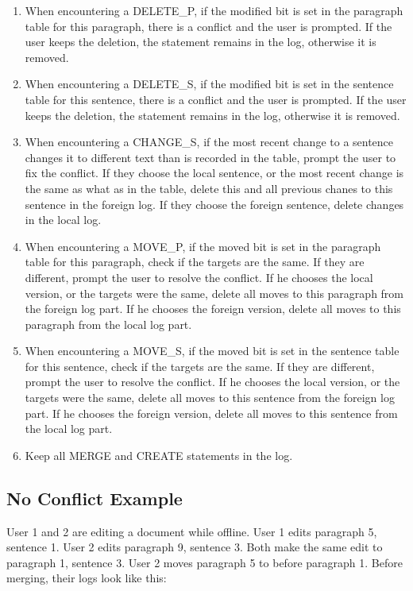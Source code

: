 \begin{enumerate}[1)]

\item When encountering a DELETE\_P, if the modified bit is set in the paragraph table for this paragraph,
      there is a conflict and the user is prompted. If the user keeps the deletion, the
      statement remains in the log, otherwise it is removed.

\item When encountering a DELETE\_S, if the modified bit is set in the sentence table for this sentence,
      there is a conflict and the user is prompted. If the user keeps the deletion, the
      statement remains in the log, otherwise it is removed.

\item When encountering a CHANGE\_S, if the most recent change to a sentence changes it to different text
      than is recorded in the table, prompt the user to fix the conflict. If they choose the local sentence,
      or the most recent change is the same as what as in the table, delete this and all previous chanes
      to this sentence in the foreign log. If they choose the foreign sentence, delete changes in the 
      local log.

\item When encountering a MOVE\_P, if the moved bit is set in the paragraph table for this paragraph,
      check if the targets are the same. If they are different, prompt the
      user to resolve the conflict. If he chooses the local version, or the targets were the same, 
      delete all moves to this paragraph
      from the foreign log part. If he chooses the foreign version, delete all moves to this paragraph
      from the local log part.

\item When encountering a MOVE\_S, if the moved bit is set in the sentence table for this sentence,
      check if the targets are the same. If they are different, prompt the
      user to resolve the conflict. If he chooses the local version, or the targets were the same, 
      delete all moves to this sentence 
      from the foreign log part. If he chooses the foreign version, delete all moves to this sentence 
      from the local log part.

\item Keep all MERGE and CREATE statements in the log.
\end{enumerate}

\subsection{No Conflict Example}
User 1 and 2 are editing a document while offline. User 1 edits paragraph 5, sentence 1. User 2 edits
paragraph 9, sentence 3. Both make the same edit to paragraph 1, sentence 3. User 2 moves paragraph 5
to before paragraph 1. Before merging, their logs look like this:

